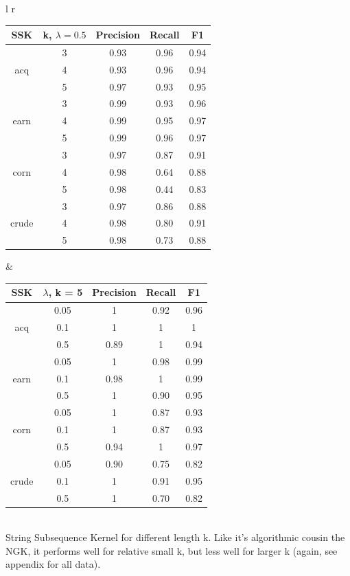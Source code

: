 \begin{tabular}{l r}	
		\begin{tabular}{| c | c | c | c | c | }\hline
			SSK & k, $ \lambda = 0.5 $ & Precision & Recall & F1   \\ \hline	
				& 3 & 0.93 & 0.96 & 0.94     \\ 
			acq& 4 & 0.93 & 0.96 &  0.94  \\
				& 5 & 0.97 & 0.93 & 0.95    \\ \hline
				& 3 & 0.99 & 0.93 & 0.96  \\ 
			earn& 4 & 0.99 & 0.95 &  0.97   \\
				& 5 & 0.99 & 0.96 & 0.97    \\  \hline
				& 3 & 0.97 & 0.87 & 0.91  \\ 
			corn& 4 & 0.98 & 0.64 & 0.88    \\ 
				& 5 & 0.98 & 0.44 &  0.83    \\ \hline
				& 3 & 0.97 & 0.86 &  0.88   \\ 
			crude& 4 & 0.98 & 0.80 & 0.91   \\ 
			 & 5 & 0.98 & 0.73 &  0.88  \\ \hline
		\end{tabular} 
&
		\begin{tabular}{| c | c | c | c | c | } \hline
			SSK & $ \lambda  $, k = 5& Precision & Recall & F1   \\ \hline	
			& 0.05 & 1 & 0.92 & 0.96     \\ 
			acq & 0.1 & 1& 1 &  1    \\
			& 0.5 & 0.89 & 1 & 0.94     \\ \hline
			& 0.05 & 1 & 0.98 &  0.99    \\ 
			earn & 0.1 & 0.98 & 1 &  0.99    \\ 
			& 0.5 & 1 & 0.90 &  0.95    \\ \hline
			& 0.05 & 1 & 0.87 & 0.93     \\ 
			corn & 0.1 & 1 & 0.87 & 0.93     \\ 
			& 0.5 & 0.94 & 1 &  0.97   \\ \hline
			& 0.05 & 0.90 & 0.75 &  0.82    \\ 
			crude & 0.1 & 1 & 0.91 & 0.95     \\ 
			& 0.5 & 1 & 0.70 &  0.82    \\ \hline
	\end{tabular}
\end{tabular}
 \\
String Subsequence Kernel for different length k. Like it's algorithmic cousin the NGK, it performs well for relative small k, but less well for larger k (again, see appendix for all data). 

